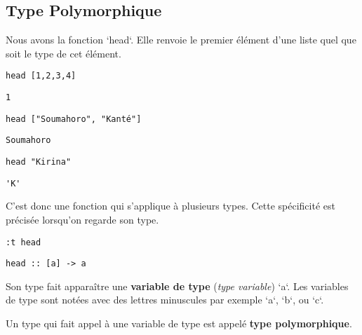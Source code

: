 \documentclass[11pt]{article}
\begin{document}
\subsection{Type Polymorphique}
\label{sec:org8f82221}
Nous avons  la fonction `head`.  Elle renvoie le premier élément d'une liste quel que soit le type de cet élément.
\begin{verbatim}
head [1,2,3,4]
\end{verbatim}
\begin{verbatim}
1
\end{verbatim}


\begin{verbatim}
head ["Soumahoro", "Kanté"]
\end{verbatim}
\begin{verbatim}
Soumahoro
\end{verbatim}


\begin{verbatim}
head "Kirina"
\end{verbatim}
\begin{verbatim}
'K'
\end{verbatim}


C'est donc une fonction qui s'applique à plusieurs types.  Cette spécificité est précisée lorsqu'on regarde son type.
\begin{verbatim}
:t head
\end{verbatim}
\begin{verbatim}
head :: [a] -> a
\end{verbatim}


Son type fait apparaître une \textbf{variable de type} (\emph{type variable}) `a`.  Les variables de type sont notées avec des lettres minuscules par exemple `a`, `b`, ou `c`.

Un type qui fait appel à une variable de type est appelé \textbf{type polymorphique}.
\end{document}
